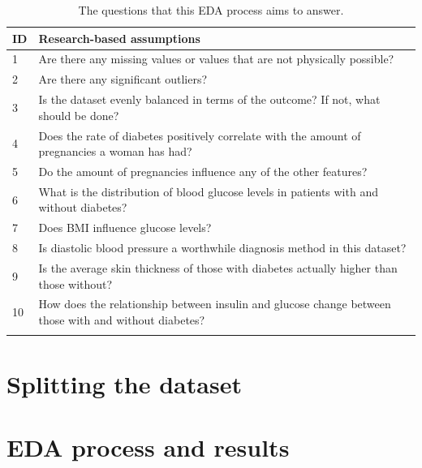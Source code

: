 \documentclass[12pt]{report}
\begin{document}
\begin{longtable}{ | p{} | p{} | }
    \hline
    \cellcolor{blue!25} ID & \cellcolor{blue!25} Research-based assumptions \\
    \hline
    1 & Are there any missing values or values that are not physically possible?\\
    \hline
    2 & Are there any significant outliers?\\
    \hline 
    3 & Is the dataset evenly balanced in terms of the outcome? If not, what should be done?\\
    \hline 
    4 & Does the rate of diabetes positively correlate with the amount of pregnancies a woman has had?\\
    \hline
    5 & Do the amount of pregnancies influence any of the other features?\\
    \hline
    6 & What is the distribution of blood glucose levels in patients with and without diabetes?\\
    \hline
    7 & Does BMI influence glucose levels?\\
    \hline
    8 & Is diastolic blood pressure a worthwhile diagnosis method in this dataset?\\
    \hline
    9 & Is the average skin thickness of those with diabetes actually higher than those without?\\
    \hline
    10 & How does the relationship between insulin and glucose change between those with and without diabetes?\\
    \hline
    \caption{The questions that this EDA process aims to answer.}\label{tab:Questions}
\end{longtable}

\section{Splitting the dataset}

\section{EDA process and results}

\end{document}
